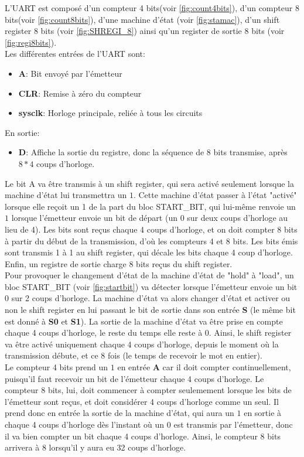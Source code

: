 \documentclass[a4paper]{article} %
\begin{document}
\begin{tcolorbox}[colframe=Monokaimagenta,colback=white]
L'UART est composé d'un compteur 4 bits(voir \ref{fig:count4bits}), d'un compteur 8 bits(voir \ref{fig:count8bits}), d'une machine d'état (voir \ref{fig:stamac}), d'un shift register 8 bits (voir \ref{fig:SHREGI_8}) ainsi qu'un register de sortie 8 bits (voir \ref{fig:regi8bits}).\\
Les différentes entrées de l'UART sont:
\begin{itemize}
    \item     \textbf{A}: Bit envoyé par l'émetteur
    \item     \textbf{CLR}: Remise à zéro du compteur
    \item     \textbf{sysclk}: Horloge principale, reliée à tous les circuits
\end{itemize}
En sortie:
\begin{itemize}
    \item     \textbf{D}: Affiche la sortie du registre, donc la séquence de 8 bits transmise, après $8*4$ coups d'horloge.
\end{itemize}
Le bit A va être transmis à un shift register, qui sera activé seulement lorsque la machine d'état lui transmettra un $1$. Cette machine d'état passer à l'état "activé" lorsque elle reçoit un 1 de la part du bloc START\_BIT, qui lui-même renvoie un $1$ lorsque l'émetteur envoie un bit de départ (un $0$ sur deux coups d'horloge au lieu de 4). Les bits sont reçus chaque 4 coups d'horloge, et on doit compter 8 bits à partir du début de la transmission, d'où les compteurs 4 et 8 bits. Les bits émis sont transmis 1 à 1 au shift register, qui décale les bits chaque 4 coup d'horloge. Enfin, un registre de sortie charge 8 bits reçus du shift register.\\
Pour provoquer le changement d'état de la machine d'état de "hold" à "load", un bloc START\_BIT (voir \ref{fig:startbit}) va détecter lorsque l'émetteur envoie un bit $0$ sur 2 coups d'horloge. La machine d'état va alors changer d'état et activer ou non le shift register en lui passant le bit de sortie dans son entrée \textbf{S} (le même bit est donné à \textbf{S0} et \textbf{S1}). La sortie de la machine d'état va être prise en compte chaque 4 coups d'horloge, le reste du temps elle reste à 0. Ainsi, le shift register va être activé uniquement chaque 4 coups d'horloge, depuis le moment où la transmission débute, et ce 8 fois (le temps de recevoir le mot en entier).\\
Le compteur 4 bits prend un $1$ en entrée \textbf{A} car il doit compter continuellement, puisqu'il faut recevoir un bit de l'émetteur chaque 4 coups d'horloge. Le compteur 8 bits, lui, doit commencer à compter seulemement lorsque les bits de l'émetteur sont reçus, et doit considérer 4 coups d'horloge comme un seul. Il prend donc en entrée la sortie de la machine d'état, qui aura un $1$ en sortie à chaque 4 coups d'horloge dès l'instant où un 0 est transmis par l'émetteur, donc il va bien compter un bit chaque 4 coups d'horloge. Ainsi, le compteur 8 bits arrivera à 8 lorsqu'il y aura eu 32 coups d'horloge.\\

\end{tcolorbox}
\end{document}
